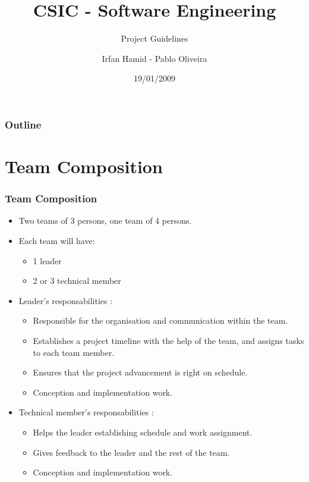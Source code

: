 \documentclass[10pt]{beamer}
\title{CSIC - Software Engineering}
\subtitle{Project Guidelines}
\author{Irfan Hamid - Pablo Oliveira}
\institute{ENST}
\date{19/01/2009}
\begin{document}
\begin{frame}
  \titlepage
\end{frame}

\begin{frame}
  \frametitle{Outline}
  \tableofcontents
\end{frame}

\section{Team Composition}
\begin{frame}
  \frametitle{Team Composition}
  \begin{itemize}
  \item Two teams of 3 persons, one team of 4 persons.
  \item Each team will have:
    \begin{itemize}
    \item 1 leader
    \item 2 or 3 technical member
    \end{itemize}
  \item Leader's responsabilities :
    \begin{itemize}
      \item Responsible for the organisation and communication within the team.
      \item Establishes a project timeline with the help of the team, and assigns
        tasks to each team member.
      \item Ensures that the project advancement is right on schedule.
      \item Conception and implementation work.
    \end{itemize}
  \item Technical member's responsabilities :
    \begin{itemize}
    \item Helps the leader establishing schedule and work assignment.
    \item Gives feedback to the leader and the rest of the team.
    \item Conception and implementation work.
    \end{itemize}
  \end{itemize}
\end{frame}
\end{document}
